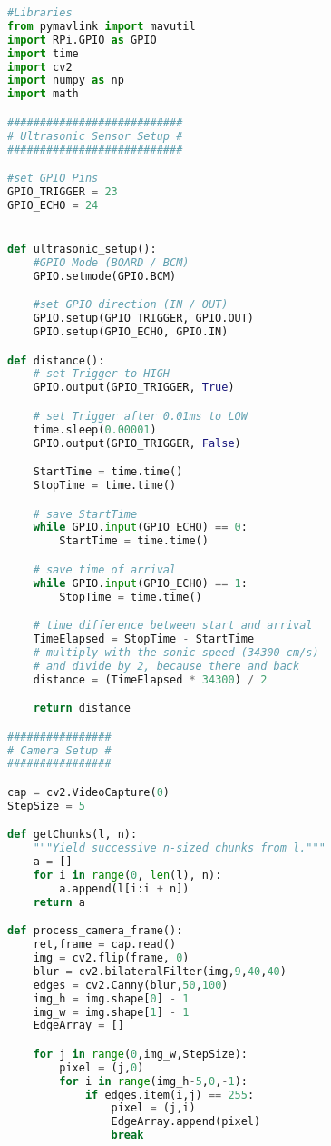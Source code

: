 \begin{lstlisting}[language=python,caption=Part 2 Python Code, label=list:part2_py]
#Libraries
from pymavlink import mavutil
import RPi.GPIO as GPIO
import time
import cv2
import numpy as np
import math

###########################
# Ultrasonic Sensor Setup #
###########################

#set GPIO Pins
GPIO_TRIGGER = 23
GPIO_ECHO = 24


def ultrasonic_setup():
    #GPIO Mode (BOARD / BCM)
    GPIO.setmode(GPIO.BCM)

    #set GPIO direction (IN / OUT)
    GPIO.setup(GPIO_TRIGGER, GPIO.OUT)
    GPIO.setup(GPIO_ECHO, GPIO.IN)

def distance():
    # set Trigger to HIGH
    GPIO.output(GPIO_TRIGGER, True)

    # set Trigger after 0.01ms to LOW
    time.sleep(0.00001)
    GPIO.output(GPIO_TRIGGER, False)

    StartTime = time.time()
    StopTime = time.time()

    # save StartTime
    while GPIO.input(GPIO_ECHO) == 0:
        StartTime = time.time()

    # save time of arrival
    while GPIO.input(GPIO_ECHO) == 1:
        StopTime = time.time()

    # time difference between start and arrival
    TimeElapsed = StopTime - StartTime
    # multiply with the sonic speed (34300 cm/s)
    # and divide by 2, because there and back
    distance = (TimeElapsed * 34300) / 2

    return distance

################
# Camera Setup #
################

cap = cv2.VideoCapture(0)
StepSize = 5

def getChunks(l, n):
    """Yield successive n-sized chunks from l."""
    a = []
    for i in range(0, len(l), n):
        a.append(l[i:i + n])
    return a

def process_camera_frame():
    ret,frame = cap.read()
    img = cv2.flip(frame, 0)
    blur = cv2.bilateralFilter(img,9,40,40)
    edges = cv2.Canny(blur,50,100)
    img_h = img.shape[0] - 1
    img_w = img.shape[1] - 1
    EdgeArray = []

    for j in range(0,img_w,StepSize):
        pixel = (j,0)
        for i in range(img_h-5,0,-1):
            if edges.item(i,j) == 255:
                pixel = (j,i)
                EdgeArray.append(pixel)
                break


\end{lstlisting}
